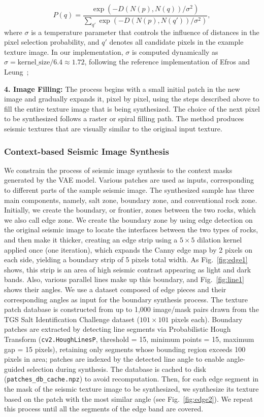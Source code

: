 \documentclass{ieeeaccess}
\begin{document}
\begin{equation}
P(q) = \frac{\exp(-D(N(p), N(q)) / \sigma^2)}{\sum_{q'} \exp(-D(N(p), N(q')) / \sigma^2)},
\end{equation}
where $\sigma$ is a temperature parameter that controls the influence of distances in the pixel selection probability, and $q'$ denotes all candidate pixels in the example texture image. In our implementation, $\sigma$ is computed dynamically as $\sigma = \text{kernel\_size} / 6.4 \approx 1.72$, following the reference implementation of Efros and Leung~\cite{Efros1999};

\textbf{4. Image Filling:} The process begins with a small initial patch in the new image and gradually expands it, pixel by pixel, using the steps described above to fill the entire texture image that is being synthesized. The choice of the next pixel to be synthesized follows a raster or spiral filling path. The method produces seismic textures that are visually similar to the original input texture. 

\subsubsection{Context-based Seismic Image Synthesis}

We constrain the process of seismic image synthesis to the context masks generated by the VAE model. Various patches are used as inputs, corresponding to different parts of the sample seismic image. The synthesized sample has three main components, namely, salt zone, boundary zone, and conventional rock zone. Initially, we create the boundary, or frontier, zones between the two rocks, which we also call edge zone. We create the boundary zone by using edge detection on the original seismic image to locate the interfaces between the two types of rocks, and then make it thicker, creating an edge strip using a $5 \times 5$ dilation kernel applied once (one iteration), which expands the Canny edge map by 2 pixels on each side, yielding a boundary strip of 5 pixels total width. As Fig.~\ref{fig:edge1} shows, this strip is an area of high seismic contrast appearing as light and dark bands. Also, various parallel lines make up this boundary, and Fig.~\ref{fig:line1} shows their angles. We use a dataset composed of edge pieces and their corresponding angles as input for the boundary synthesis process. The texture patch database is constructed from up to 1,000 image/mask pairs drawn from the TGS Salt Identification Challenge dataset ($101 \times 101$ pixels each). Boundary patches are extracted by detecting line segments via Probabilistic Hough Transform (\texttt{cv2.HoughLinesP}, threshold = 15, minimum points = 15, maximum gap = 15 pixels), retaining only segments whose bounding region exceeds 100 pixels in area; patches are indexed by the detected line angle to enable angle-guided selection during synthesis. The database is cached to disk (\texttt{patches\_db\_cache.npz}) to avoid recomputation. Then, for each edge segment in the mask of the seismic texture image to be synthesized, we synthesize its texture based on the patch with the most similar angle (see Fig.~\ref{fig:edge2}). We repeat this process until all the segments of the edge band are covered.
\end{document}
